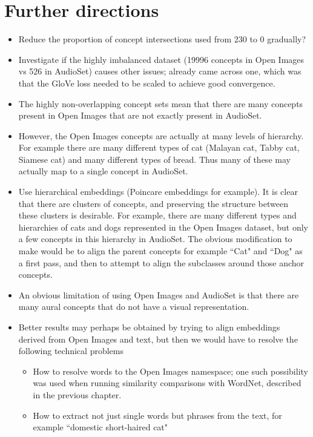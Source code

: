 \section{Further directions}

\begin{itemize}
    \item Reduce the proportion of concept intersections used from 230 to 0 gradually?
    \item Investigate if the highly imbalanced dataset (19996 concepts in Open Images vs 526 in AudioSet) causes other issues; already came across one, which was that the GloVe loss needed to be scaled to achieve good convergence. 
    \item The highly non-overlapping concept sets mean that there are many concepts present in Open Images that are not exactly present in AudioSet.
    \item However, the Open Images concepts are actually at many levels of hierarchy. For example there are many different types of cat (Malayan cat, Tabby cat, Siamese cat) and many different types of bread. Thus many of these may actually map to a single concept in AudioSet. 
    \item Use hierarchical embeddings (Poincare embeddings for example). It is clear that there are clusters of concepts, and preserving the structure between these clusters is desirable. For example, there are many different types and hierarchies of cats and dogs represented in the Open Images dataset, but only a few concepts in this hierarchy in AudioSet. The obvious modification to make would be to align the parent concepts for example ``Cat" and ``Dog" as a first pass, and then to attempt to align the subclasses around those anchor concepts. 
    \item An obvious limitation of using Open Images and AudioSet is that there are many aural concepts that do not have a visual representation. 
    \item Better results may perhaps be obtained by trying to align embeddings derived from Open Images and text, but then we would have to resolve the following technical problems
    \begin{itemize}
        \item How to resolve words to the Open Images namespace; one such possibility was used when running similarity comparisons with WordNet, described in the previous chapter. 
        \item How to extract not just single words but phrases from the text, for example ``domestic short-haired cat"
    \end{itemize}
\end{itemize}

